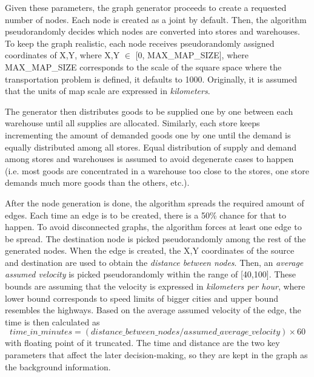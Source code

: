 \documentclass[journal,onecolumn]{IEEEtran}
\begin{document}
Given these parameters, the graph generator proceeds to create a requested number of nodes. Each node is created as a joint by default. Then, the algorithm pseudorandomly decides which nodes are converted into stores and warehouses. To keep the graph realistic, each node receives pseudorandomly assigned coordinates of {X,Y}, where X,Y \(\in\) [0, MAX\_MAP\_SIZE], where MAX\_MAP\_SIZE corresponds to the scale of the square space where the transportation problem is defined, it defaults to 1000. Originally, it is assumed that the units of map scale are expressed in \textit{kilometers}. 

The generator then distributes goods to be supplied one by one between each warehouse until all supplies are allocated. Similarly, each store keeps incrementing the amount of demanded goods one by one until the demand is equally distributed among all stores. Equal distribution of supply and demand among stores and warehouses is assumed to avoid degenerate cases to happen (i.e. most goods are concentrated in a warehouse too close to the stores, one store demands much more goods than the others, etc.).

After the node generation is done, the algorithm spreads the required amount of edges. Each time an edge is to be created, there is a 50\% chance for that to happen. To avoid disconnected graphs, the algorithm forces at least one edge to be spread. The destination node is picked pseudorandomly among the rest of the generated nodes. When the edge is created, the {X,Y} coordinates of the source and destination are used to obtain the \textit{distance between nodes}. Then, an \textit{average assumed velocity} is picked pseudorandomly within the range of [40,100]. These bounds are assuming that the velocity is expressed in \textit{kilometers per hour}, where lower bound corresponds to speed limits of bigger cities and upper bound resembles the highways. Based on the average assumed velocity of the edge, the time is then calculated as 
\begin{equation*}
time\_in\_minutes = (distance\_between\_nodes / assumed\_average\_velocity) \times 60
\end{equation*}
with floating point of it truncated. The time and distance are the two key parameters that affect the later decision-making, so they are kept in the graph as the background information.
\end{document}

